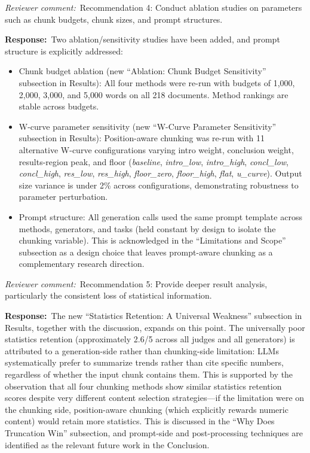 \documentclass[11pt]{article}
\newcommand{\rcomment}[1]{\noindent\textcolor{revcomment}{\textit{Reviewer comment:}}~#1\par\medskip}
\newcommand{\rresponse}[1]{\noindent\textcolor{response}{\textbf{Response:}}~#1\par\medskip\medskip}
\begin{document}
\rcomment{Recommendation 4: Conduct ablation studies on parameters such as chunk budgets, chunk sizes, and prompt structures.}

\rresponse{Two ablation/sensitivity studies have been added, and prompt structure is explicitly addressed:
\begin{itemize}
    \item Chunk budget ablation (new ``Ablation: Chunk Budget Sensitivity'' subsection in Results): All four methods were re-run with budgets of 1{,}000, 2{,}000, 3{,}000, and 5{,}000 words on all 218 documents. Method rankings are stable across budgets.
    \item W-curve parameter sensitivity (new ``W-Curve Parameter Sensitivity'' subsection in Results): Position-aware chunking was re-run with 11 alternative W-curve configurations varying intro weight, conclusion weight, results-region peak, and floor (\emph{baseline}, \emph{intro\_low}, \emph{intro\_high}, \emph{concl\_low}, \emph{concl\_high}, \emph{res\_low}, \emph{res\_high}, \emph{floor\_zero}, \emph{floor\_high}, \emph{flat}, \emph{u\_curve}). Output size variance is under 2\% across configurations, demonstrating robustness to parameter perturbation.
    \item Prompt structure: All generation calls used the same prompt template across methods, generators, and tasks (held constant by design to isolate the chunking variable). This is acknowledged in the ``Limitations and Scope'' subsection as a design choice that leaves prompt-aware chunking as a complementary research direction.
\end{itemize}}

\rcomment{Recommendation 5: Provide deeper result analysis, particularly the consistent loss of statistical information.}

\rresponse{The new ``Statistics Retention: A Universal Weakness'' subsection in Results, together with the discussion, expands on this point. The universally poor statistics retention (approximately 2.6/5 across all judges and all generators) is attributed to a generation-side rather than chunking-side limitation: LLMs systematically prefer to summarize trends rather than cite specific numbers, regardless of whether the input chunk contains them. This is supported by the observation that all four chunking methods show similar statistics retention scores despite very different content selection strategies---if the limitation were on the chunking side, position-aware chunking (which explicitly rewards numeric content) would retain more statistics. This is discussed in the ``Why Does Truncation Win'' subsection, and prompt-side and post-processing techniques are identified as the relevant future work in the Conclusion.}
\end{document}
